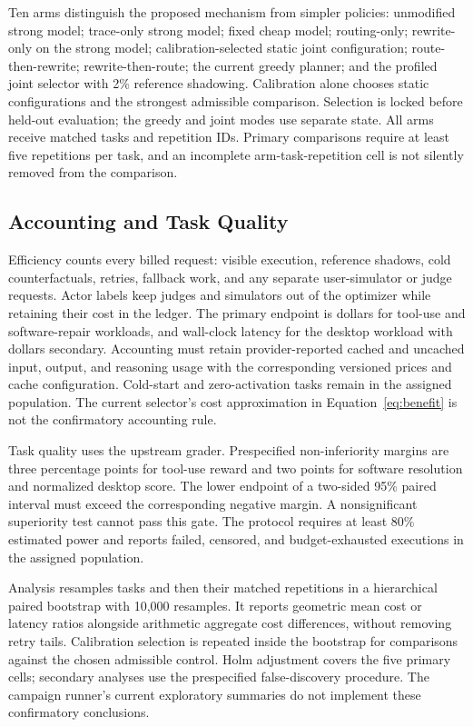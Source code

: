 Ten arms distinguish the proposed mechanism from simpler policies:
unmodified strong model; trace-only strong model; fixed cheap model; routing-only;
rewrite-only on the strong model; calibration-selected static joint configuration;
route-then-rewrite; rewrite-then-route; the current greedy planner; and the profiled
joint selector with 2\% reference shadowing. Calibration alone chooses static
configurations and the strongest admissible comparison. Selection is locked before
held-out evaluation; the greedy and joint modes use separate state. All arms receive
matched tasks and repetition IDs. Primary comparisons require at least five
repetitions per task, and an incomplete arm-task-repetition cell is not silently
removed from the comparison.

\subsection{Accounting and Task Quality}

Efficiency counts every billed request: visible execution, reference shadows,
cold counterfactuals, retries, fallback work, and any separate user-simulator or
judge requests. Actor labels keep judges and simulators out of the optimizer while
retaining their cost in the ledger. The primary endpoint is dollars for tool-use
and software-repair workloads, and wall-clock latency for the desktop workload
with dollars secondary. Accounting must retain provider-reported cached and uncached
input, output, and reasoning usage with the corresponding versioned prices and
cache configuration. Cold-start and zero-activation tasks remain in the assigned
population. The current selector's cost approximation in
Equation~\ref{eq:benefit} is not the confirmatory accounting rule.

Task quality uses the upstream grader. Prespecified non-inferiority margins are
three percentage points for tool-use reward and two points for software resolution
and normalized desktop score. The lower endpoint of a two-sided 95\% paired
interval must exceed the corresponding negative margin. A nonsignificant superiority
test cannot pass this gate. The protocol requires at least 80\% estimated power
and reports failed, censored, and budget-exhausted executions in the assigned
population.

Analysis resamples tasks and then their matched repetitions in a hierarchical paired
bootstrap with 10,000 resamples. It reports geometric mean cost or latency ratios
alongside arithmetic aggregate cost differences, without removing retry tails.
Calibration selection is repeated inside the bootstrap for comparisons against the
chosen admissible control. Holm adjustment covers the five primary cells; secondary
analyses use the prespecified false-discovery procedure. The campaign runner's
current exploratory summaries do not implement these confirmatory conclusions.

